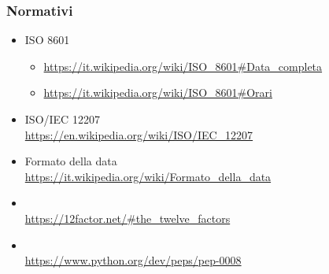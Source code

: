     \subsubsection{Normativi}	\label{rifnorma}
    \begin{itemize}
        \item ISO 8601 
        \begin{itemize}
            \item \url{https://it.wikipedia.org/wiki/ISO\_8601#Data_completa}
            \item \url{https://it.wikipedia.org/wiki/ISO\_8601#Orari}
        \end{itemize}
    	\item ISO/IEC 12207 \\\url{https://en.wikipedia.org/wiki/ISO/IEC_12207}
    	\item Formato della data \\\url{https://it.wikipedia.org/wiki/Formato\_della\_data}
        \item {}\\ %
        \url{https://12factor.net/#the_twelve_factors}
        \item {} \\\url{https://www.python.org/dev/peps/pep-0008}
    \end{itemize}

